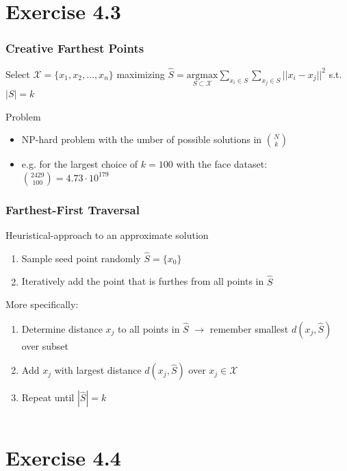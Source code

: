 \documentclass[10pt,aspectratio=169,handout]{beamer}
\begin{document}
\section{Exercise 4.3}

\begin{frame}
    \frametitle{Creative Farthest Points}

    Select $\mathcal{X} = \{x_1, x_2, \dots, x_n \}$ maximizing $\hat{S} = \underset{S \subset \mathcal{X}}{\mathrm{argmax}}  \underset{x_i \in S}\sum \underset{x_j \in S}\sum || x_i - x_j||^2$ s.t. $|S| = k$

    Problem
    \begin{itemize}
        \item NP-hard problem with the umber of possible solutions in ${N\choose k}$
        \item e.g. for the largest choice of $k=100$ with the face dataset: ${2429\choose 100} = 4.73 \cdot 10^{179}$ 
    \end{itemize}
\end{frame}

\begin{frame}
    \frametitle{Farthest-First Traversal}
    Heuristical-approach to an approximate solution
    \begin{enumerate}
        \item Sample seed point randomly $\hat{S} = \{ x_0 \}$
        \item Iteratively add the point that is furthes from all points in $\hat{S}$
    \end{enumerate}

    More specifically: 
    \begin{enumerate}
        \item Determine distance $x_j$ to all points in $\hat{S}$ $\rightarrow$ remember smallest $d(x_j, \hat{S})$ over subset
        \item Add $x_j$ with largest distance $d(x_j, \hat{S})$ over $x_j  \in \mathcal{X}$
        \item Repeat until $|\hat{S}| = k$
    \end{enumerate}
\end{frame}

\begin{frame}
    \inputminted[bgcolor=LightGray,fontsize=\small]{python}{code/farthest-first.py}
\end{frame}


\section{Exercise 4.4}
\end{document}
